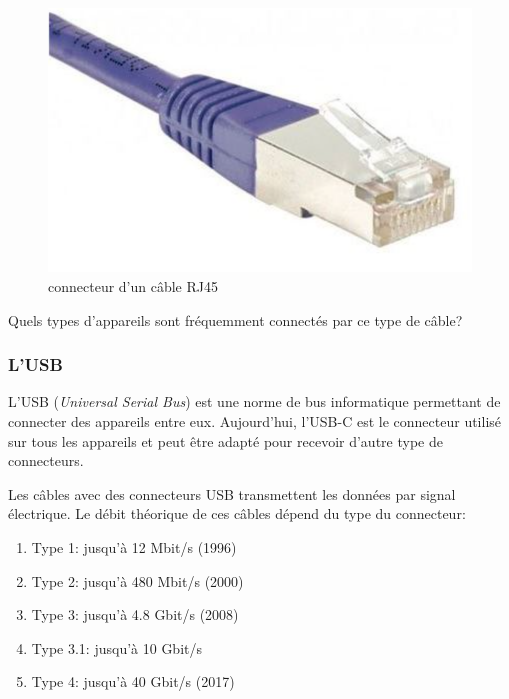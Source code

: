 \documentclass[11pt, a4paper]{book}
\begin{document}
\begin{figure}[h]
\begin{center}
\includegraphics[scale=.5]{images/RJ45}
\caption{connecteur d'un câble RJ45}
\end{center}
\end{figure}

\begin{exercice}
Quels types d'appareils sont fréquemment connectés par ce type de câble?
\end{exercice}


\subsubsection{L'USB}



L'USB ({\it Universal Serial Bus}) est une norme de bus informatique permettant de connecter des appareils entre eux. Aujourd'hui, l'USB-C est le connecteur utilisé sur tous les appareils et peut être adapté pour recevoir d'autre type de connecteurs. 




Les câbles avec des connecteurs USB transmettent les données par signal électrique. Le débit théorique de ces câbles dépend du type du connecteur:
\begin{enumerate}
\item Type 1: jusqu'à 12 Mbit/s (1996)
\item Type 2: jusqu'à 480 Mbit/s (2000)
\item Type 3: jusqu'à 4.8 Gbit/s (2008)
\item Type 3.1: jusqu'à 10 Gbit/s
\item Type 4: jusqu'à 40 Gbit/s (2017)
\end{enumerate}
\end{document}
